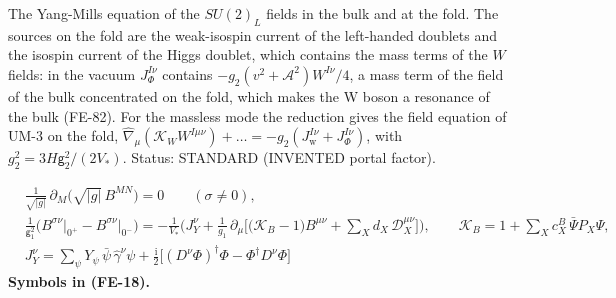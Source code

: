 \documentclass[
  10pt,
]{article}
\begin{document}
The Yang-Mills equation of the \(SU(2)_L\) fields in the bulk and at the
fold. The sources on the fold are the weak-isospin current of the
left-handed doublets and the isospin current of the Higgs doublet, which
contains the mass terms of the \(W\) fields: in the vacuum
\(J_\Phi^{I\nu}\) contains \(-g_2(v^2 + \mathcal{A}^2)W^{I\nu}/4\), a
mass term of the field of the bulk concentrated on the fold, which makes
the W boson a resonance of the bulk (FE-82). For the massless mode the
reduction gives the field equation of UM-3 on the fold,
\(\hat\nabla_\mu(\mathcal{K}_{W}W^{I\mu\nu}) + \dots = -g_2(J_{\mathrm{w}}^{I\nu} + J_\Phi^{I\nu})\),
with \(g_2^2 = 3H\mathsf{g}_2^2/(2V_*)\). Status: STANDARD (INVENTED
portal factor).

\[
\begin{aligned}
&\frac{1}{\sqrt{\lvert g\rvert}}\,\partial_M\big(\sqrt{\lvert g\rvert}\,B^{MN}\big) = 0\qquad (\sigma \ne 0),\\
&\frac{1}{\mathsf{g}_1^2}\Big(B^{\sigma\nu}\big\vert_{0^+} - B^{\sigma\nu}\big\vert_{0^-}\Big)
 = -\frac{1}{V_*}\Big(J_Y^\nu + \frac{1}{g_1}\,\partial_\mu\Big[\big(\mathcal{K}_{B} - 1\big)B^{\mu\nu} + \sum_X d_X\,\mathcal{D}_X^{\mu\nu}\Big]\Big),\qquad
 \mathcal{K}_{B} = 1 + \sum_X c^{B}_X\,\bar\Psi P_X\Psi,\\
&J_Y^\nu = \sum_\psi Y_\psi\,\bar\psi\,\hat\gamma^\nu\psi + \frac{\mathrm{i}}{2}\big[(D^\nu\Phi)^\dagger\Phi - \Phi^\dagger D^\nu\Phi\big]
\end{aligned} \tag{FE-18}
\] \textbf{Symbols in (FE-18).}
\end{document}
